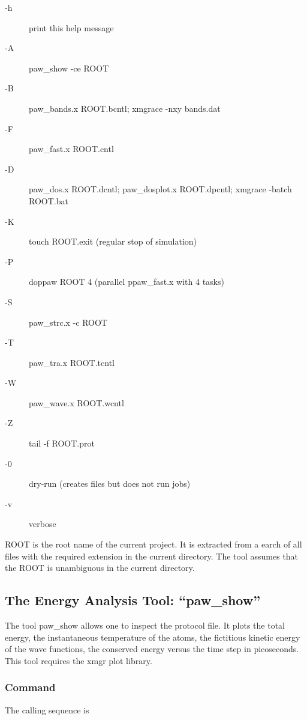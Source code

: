 \documentclass[final,12pt]{article}
\begin{document}
{{{{{{\begin{description}
\item[-h] print this help message
\item[-A] paw\_show -ce ROOT
\item[-B] paw\_bands.x ROOT.bcntl; xmgrace -nxy bands.dat
\item[-F] paw\_fast.x ROOT.cntl 
\item[-D] paw\_dos.x ROOT.dcntl; paw\_dosplot.x ROOT.dpcntl; 
  xmgrace -batch ROOT.bat
\item[-K] touch ROOT.exit (regular stop of simulation)
\item[-P] doppaw ROOT 4 (parallel ppaw\_fast.x with 4 tasks)
\item[-S] paw\_strc.x -c ROOT
\item[-T] paw\_tra.x ROOT.tcntl
\item[-W] paw\_wave.x ROOT.wcntl
\item[-Z] tail -f ROOT.prot
\item[-0] dry-run (creates files but does not run jobs)
\item[-v] verbose
\end{description}

ROOT is the root name of the current project. It is extracted from a
earch of all files with the required extension in the current
directory.  The tool assumes that the ROOT is unambiguous in the
current directory.

\subsection{The Energy Analysis Tool: ``paw\_show''}
\label{sec:pawshow}
The tool paw\_show allows one to inspect the protocol file. It plots the
total energy, the instantaneous temperature of the atoms, the
fictitious kinetic energy of the wave functions, the conserved energy
versus the time step in picoseconds. This tool requires the xmgr plot
library\cite{xmgrace}.

\subsubsection{Command}

The calling sequence is

}}}}}}
\end{document}
